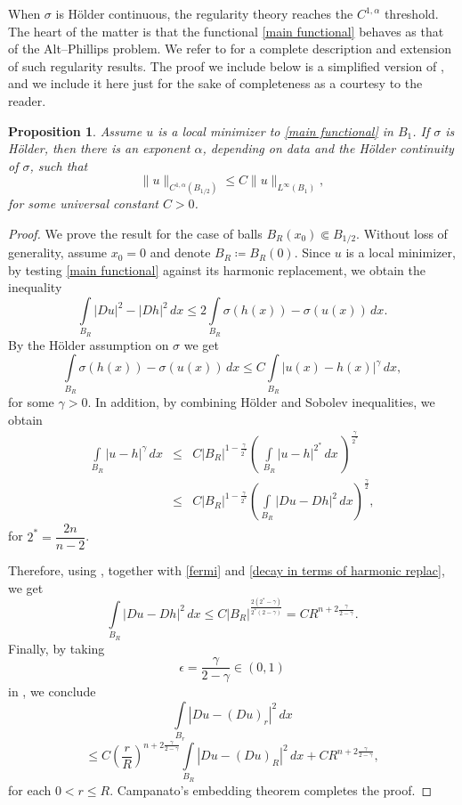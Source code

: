 \documentclass[reqno,11pt]{amsart}
\newtheorem{proposition}{Proposition}[section]
\newcommand{\1}{\mathds{1}}  %
\numberwithin{equation}{section}
\begin{document}
When $\sigma$ is H\"older continuous, the regularity theory reaches the $C^{1,\alpha}$ threshold. The heart of the matter is that the functional \eqref{main functional} behaves as that of the Alt--Phillips problem. We refer to \cite{DeFM} for a complete description and extension of such regularity results. The proof we include below is a simplified version of \cite[Theorem 2.1]{ASTU}, and we include it here just for the sake of completeness as a courtesy to the reader.

\begin{proposition}\label{holder sigma}
Assume $u$ is a local minimizer to \eqref{main functional} in $B_1$. If $\sigma$ is H\"older, then there is an exponent $\alpha$, depending on data and the H\"older continuity of $\sigma$, such that
$$
    \|u\|_{C^{1,\alpha}(B_{1/2})} \leq C\|u\|_{L^\infty(B_1)},
$$
for some universal constant $C>0$.
\end{proposition}

\begin{proof}
We prove the result for the case of balls $B_R(x_0) \Subset B_{1/2}$.
Without loss of generality, assume $x_0=0$ and denote $B_R\coloneqq B_R(0)$. 
Since $u$ is a local minimizer, by testing \eqref{main functional} against its harmonic replacement, we obtain the inequality
\begin{equation} \label{fermi}
\displaystyle\int\limits_{B_R}|Du|^2-|Dh|^2 \, dx  \leq  2 \displaystyle\int\limits_{B_R}  \sigma(h(x))-\sigma(u(x)) \, dx.
\end{equation}
By the H\"older assumption on $\sigma$ we get
$$
    \displaystyle\int\limits_{B_R}  \sigma(h(x))-\sigma(u(x)) \, dx \leq C \int\limits_{B_R} |u(x)-h(x)|^{\gamma}\, dx,
$$
for some $\gamma > 0$. In addition, by combining H\"older  and Sobolev inequalities, we obtain
\begin{eqnarray}
    \int\limits_{B_R} |u-h|^{\gamma}\, dx & \leq & C |B_R|^{1-\frac{\gamma}{2^{\ast}}}\left( \,\int\limits_{B_R} |u-h|^{2^{\ast}}\, dx \, \right)^{\frac{\gamma}{2^{\ast}}} \nonumber \\
& \leq & C |B_R|^{1-\frac{\gamma}{2^{\ast}}}\left( \displaystyle \int\limits_{B_R} |Du-Dh|^{2}\, dx \right)^{\frac{\gamma}{2}}, \label{trieste}
\end{eqnarray}
for $2^{\ast}=\dfrac{2n}{n-2}$. 

Therefore, using , together with \eqref{fermi} and \eqref{decay in terms of harmonic replac}, we get
\begin{equation}\label{Cariri7}
\int\limits_{B_R}|Du-Dh|^2 \, dx \leq C |B_R|^{\frac{2(2^{\ast}-\gamma)}{2^{\ast}(2-\gamma)}}=CR^{n+2\frac{\gamma}{2-\gamma}}.
\end{equation}
Finally, by taking 
$$
\epsilon=\frac{\gamma}{2-\gamma} \in (0,1)
$$
in , we conclude 
$$\int\limits_{B_r}|Du-(Du)_r|^2 \, dx $$
$$\leq C\left( \frac{r}{R}\right)^{n+2\frac{\gamma}{2-\gamma}} \int\limits_{B_R}|Du-(Du)_R|^2 \, dx + CR^{n+2\frac{\gamma}{2-\gamma}},
$$
for each $0<r \leq R$. Campanato's embedding theorem completes the proof.
\end{proof}
\end{document}
